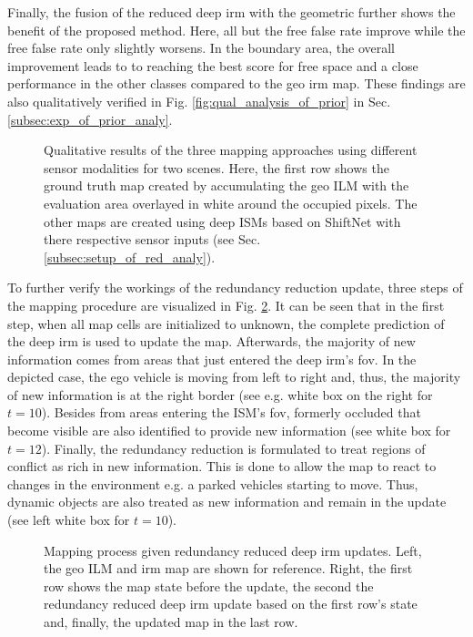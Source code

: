 Finally, the fusion of the reduced deep \gls{irm} with the geometric further shows the benefit of the proposed method. Here, all but the free false rate improve while the free false rate only slightly worsens. In the boundary area, the overall improvement leads to to reaching the best score for free space and a close performance in the other classes compared to the geo \gls{irm} map. These findings are also qualitatively verified in Fig. \ref{fig:qual_analysis_of_prior} in Sec. \ref{subsec:exp_of_prior_analy}.
\begin{figure}[H]
	\begin{center}
		\caption{\label{fig:qual_analysis_of_redundant_info}Qualitative results of the three mapping approaches using different sensor modalities for two scenes. Here, the first row shows the ground truth map created by accumulating the geo ILM with the evaluation area overlayed in white around the occupied pixels. The other maps are created using deep ISMs based on ShiftNet with there respective sensor inputs (see Sec. \ref{subsec:setup_of_red_analy}).}
	\end{center}
\end{figure}
To further verify the workings of the redundancy reduction update, three steps of the mapping procedure are visualized in Fig. \ref{fig:viz_mapping_progress}. It can be seen that in the first step, when all map cells are initialized to unknown, the complete prediction of the deep \gls{irm} is used to update the map. Afterwards, the majority of new information comes from areas that just entered the deep \gls{irm}'s \gls{fov}. In the depicted case, the ego vehicle is moving from left to right and, thus, the majority of new information is at the right border (see e.g. white box on the right for $t=10$). Besides from areas entering the ISM's \gls{fov}, formerly occluded that become visible are also identified to provide new information (see white box for $t=12$). Finally, the redundancy reduction is formulated to treat regions of conflict as rich in new information. This is done to allow the map to react to changes in the environment e.g. a parked vehicles starting to move. Thus, dynamic objects are also treated as new information and remain in the update (see left white box for $t=10$).
\begin{figure}[H]
	\begin{center}
		\caption{\label{fig:viz_mapping_progress}Mapping process given redundancy reduced deep \gls{irm} updates. Left, the geo ILM and \gls{irm} map are shown for reference. Right, the first row shows the map state before the update, the second the redundancy reduced deep \gls{irm} update based on the first row's state and, finally, the updated map in the last row.}
	\end{center}
\end{figure}
%
